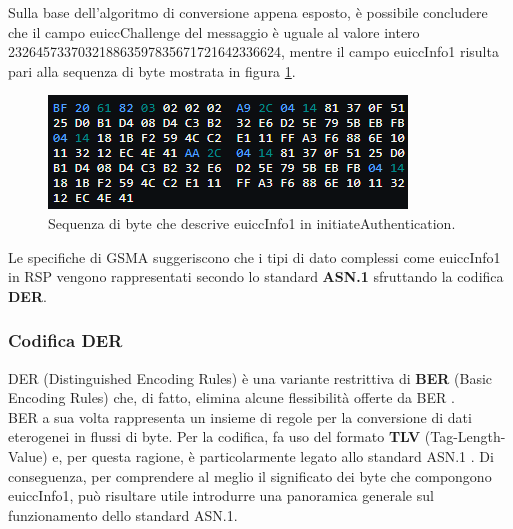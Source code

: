 \documentclass[10pt, oneside]{book}
\begin{document}
Sulla base dell'algoritmo di conversione appena esposto, è possibile concludere che il campo euiccChallenge del messaggio è uguale al valore intero 232645733703218863597835671721642336624, mentre il campo euiccInfo1 risulta pari alla sequenza di byte mostrata in figura \ref{fig:asn1-euiccInfo1}.\\
\begin{figure}
\includegraphics[width=\linewidth]{asn1-euiccInfo1.png}
\caption{Sequenza di byte che descrive euiccInfo1 in initiateAuthentication.}
\label{fig:asn1-euiccInfo1}
\end{figure}
Le specifiche di GSMA \cite{GSMA-docs-new} suggeriscono che i tipi di dato complessi come euiccInfo1 in RSP vengono rappresentati secondo lo standard \textbf{ASN.1} sfruttando la codifica \textbf{DER}.

\subsubsection{Codifica DER}
DER (Distinguished Encoding Rules) è una variante restrittiva di \textbf{BER} (Basic Encoding Rules) che, di fatto, elimina alcune flessibilità offerte da BER \cite{DER}.\\
BER a sua volta rappresenta un insieme di regole per la conversione di dati eterogenei in flussi di byte. Per la codifica, fa uso del formato \textbf{TLV} (Tag-Length-Value) e, per questa ragione, è particolarmente legato allo standard ASN.1 \cite{BER}. Di conseguenza, per comprendere al meglio il significato dei byte che compongono euiccInfo1, può risultare utile introdurre una panoramica generale sul funzionamento dello standard ASN.1.
\end{document}
